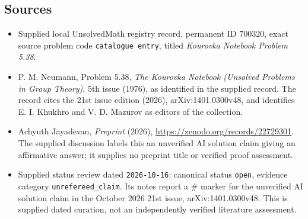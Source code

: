 \documentclass[11pt]{article}
\begin{document}
\subsection{Sources}
\begin{itemize}
\item Supplied local UnsolvedMath registry record, permanent ID \(700320\), exact source problem code \texttt{catalogue entry}, titled \emph{Kourovka Notebook Problem 5.38}.
\item P. M. Neumann, Problem 5.38, \emph{The Kourovka Notebook (Unsolved Problems in Group Theory)}, 5th issue (1976), as identified in the supplied record. The record cites the 21st issue edition (2026), arXiv:1401.0300v48, and identifies E. I. Khukhro and V. D. Mazurov as editors of the collection.
\item Achyuth Jayadevan, \emph{Preprint} (2026), \url{https://zenodo.org/records/22729301}. The supplied discussion labels this an unverified AI solution claim giving an affirmative answer; it supplies no preprint title or verified proof assessment.
\item Supplied status review dated \texttt{2026-10-16}: canonical status \texttt{open}, evidence category \texttt{unrefereed\_claim}. Its notes report a \(\#\) marker for the unverified AI solution claim in the October 2026 21st issue, arXiv:1401.0300v48. This is supplied dated curation, not an independently verified literature assessment.
\end{itemize}
\end{document}
